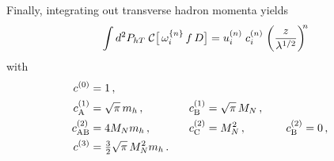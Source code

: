 \documentclass[a4paper,11pt]{article}
\newcommand{\be}{\begin{equation}}
\newcommand{\ee}{\end{equation}}
\def\Phperp{P_{hT}}
\newcommand*{\BibPath}{.}%
\begin{document}
Finally, integrating out transverse hadron momenta yields
\be
	\int d^2\Phperp\;
	{\cal C}\bigl[\,\omega^{\{n\}}_{i} \, f \, D \bigr] 
	= u^{(n)}_{i} \;c^{(n)}_{i}\;\biggl(\frac{z}{\lambda^{1/2}}\biggr)^{\!\!n}
\ee
with
\begin{alignat}{7}
	c^{(0)}_{\rm  } 	&= 1 \, , \\
	c^{(1)}_{\rm A} 	&= \sqrt{\pi}\,m_h	\, , &
	c^{(1)}_{\rm B} 	&= \sqrt{\pi}\,M_N	\, , \\
	c^{(2)}_{\rm AB} 	&= 4M_Nm_h		\, , \;\;\;\;\;\; & 
	c^{(2)}_{\rm C} 	&= M_N^2 		\, , \;\;\;\;\;\;\;\;\;\; & 
	c^{(2)}_{\rm B}	&= 0 			\, ,\\
	c^{(3)}_{\rm  } 	&= {\textstyle\frac32}\sqrt{\pi} \,M_N^2m_h 
	\, . \;\;\;     &
			&
	\label{Eq:Gaussian-integrals-working-III}
\end{alignat}



\end{document}
